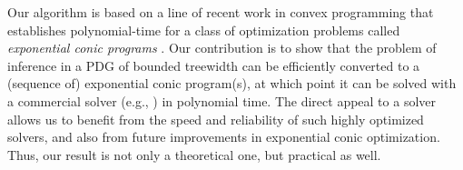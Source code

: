 \documentclass{article}
\newcommand\otodo[2][]{\todo[color=olicolor!30!white,#1]{#2}}
\begin{document}
Our algorithm
is based on a line of recent work in 
convex programming
that establishes
polynomial-time
for a class of optimization problems called \emph{exponential conic programs}
\parencite{badenbroek2021algorithm,skajaa2015homogeneous,nesterov1996infeasible}.
Our contribution is to show that the problem of inference in a PDG
of bounded treewidth
can be efficiently converted to a (sequence of) exponential conic program(s), at which point it can be solved with a commercial solver
(e.g., \textcite{mosek}) in polynomial time. 
The direct appeal to a solver allows us
to benefit from the speed and reliability of such highly optimized solvers, and also from future improvements in exponential conic optimization.
Thus, our result is not only a theoretical one, but practical as well.
\end{document}
